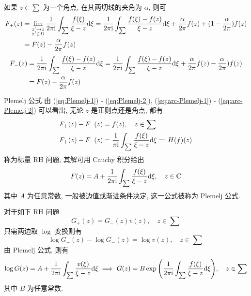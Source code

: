 \begin{remark}
  如果 $ z \in \sum $ 为一个角点, 在其两切线的夹角为 $ \alpha $, 则可
  \begin{equation}\begin{aligned}
      F_{+}(z) &= \lim_{\substack{z' \to z \\ z' \in D}} \frac{1}{2 \pi \mathrm{i}} \int_{\sum}  \frac{f(\xi)}{\xi - z}  \mathrm{d} \xi = \frac{1}{2 \pi \mathrm{i}} \int_{\sum}  \frac{f(\xi) - f(z)}{\xi - z}  \mathrm{d} \xi + \frac{\alpha}{2 \pi} f(z) + (1 - \frac{\alpha}{2 \pi}) f(z) \\
              &= F(z) - \frac{\alpha}{2 \pi} f(z) \label{eq:arc-Plemelj-1}
    \end{aligned}\end{equation}
  \begin{equation}\begin{aligned}
      F_{-}(z) & = \frac{1}{2 \pi \mathrm{i}} \int_{\sum}  \frac{f(\xi) - f(z)}{\xi - z}  \mathrm{d} \xi = \frac{1}{2 \pi \mathrm{i}} \int_{\sum}  \frac{f(\xi) - f(z)}{\xi - z}  \mathrm{d} \xi + \frac{\alpha}{2 \pi} f(z) - \frac{\alpha}{2 \pi}) f(z) \\
              &= F(z) - \frac{\alpha}{2 \pi} f(z) \label{eq:arc-Plemelj-2}
    \end{aligned}\end{equation}
\end{remark}
\begin{definition}{Plemelj 公式}
  由 (\ref{eq:Plemelj-1}) - (\ref{eq:Plemelj-2}), (\ref{eq:arc-Plemelj-1}) - (\ref{eq:arc-Plemelj-2}) 可以看出, 无论 $ z $ 是正则点还是角点, 都有 
\begin{align}
  F_{+}(z) - F_{-}(z) &= f(z), \quad z \in \sum \\
  F_{+}(z) - F_{-}(z) &= \frac{1}{\pi \mathrm{i}} \int_{\sum} \frac{f(\xi)}{\xi - z} \mathrm{d} \xi =: H(f)(z)
\end{align}
称为标量 RH 问题, 其解可用 Cauchy 积分给出
\begin{equation}
  F(z) = A + \frac{1}{2 \pi \mathrm{i}} \int_{\sum} \frac{f(\xi)}{\xi - z} \mathrm{d} \xi, \quad z \in \mathbb{C}
\end{equation}
其中 $ A $ 为任意常数, 一般被边值或渐进条件决定, 这一公式被称为 Plemelj 公式. 
\end{definition}


对于如下 RH 问题
\begin{equation}
  G_{+}(z) = G_{-}(z)v(z), \quad z\in \sum
\end{equation}
只需两边取 $ \log $ 变换则有
\begin{equation}
  \log{G_{+}(z)}- \log{G_{-}(z)} =  \log{v(z)}, \quad z\in \sum
\end{equation}
由 Plemelj 公式, 则有 
\begin{equation}
  \log{G(z)} = A + \frac{1}{2 \pi \mathrm{i}} \int_{\sum} \frac{v(\xi)}{\xi - z} \mathrm{d} \xi \implies G(z) = B \exp{\left( \frac{1}{2 \pi \mathrm{i}} \int_{\sum} \frac{f(\xi)}{\xi - z} \mathrm{d}\xi \right)}, \quad z\in \sum
\end{equation}
其中 $ B $ 为任意常数. 

